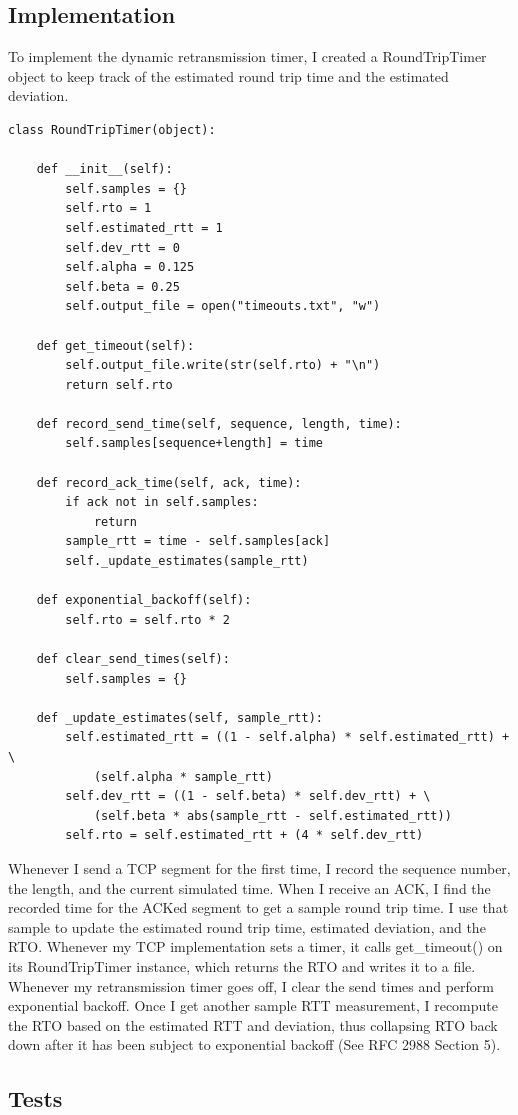 \documentclass[11pt]{article}
\begin{document}
\subsection{Implementation}
To implement the dynamic retransmission timer, I created a RoundTripTimer object to keep track of the estimated round trip time and the estimated deviation.
\begin{lstlisting}
class RoundTripTimer(object):
	
	def __init__(self):
		self.samples = {}
		self.rto = 1
		self.estimated_rtt = 1
		self.dev_rtt = 0
		self.alpha = 0.125
		self.beta = 0.25
		self.output_file = open("timeouts.txt", "w")

	def get_timeout(self):
		self.output_file.write(str(self.rto) + "\n")
		return self.rto

	def record_send_time(self, sequence, length, time):
		self.samples[sequence+length] = time

	def record_ack_time(self, ack, time):
		if ack not in self.samples:
			return
		sample_rtt = time - self.samples[ack]
		self._update_estimates(sample_rtt)

	def exponential_backoff(self):
		self.rto = self.rto * 2

	def clear_send_times(self):
		self.samples = {}

	def _update_estimates(self, sample_rtt):
		self.estimated_rtt = ((1 - self.alpha) * self.estimated_rtt) + \
			(self.alpha * sample_rtt)
		self.dev_rtt = ((1 - self.beta) * self.dev_rtt) + \
			(self.beta * abs(sample_rtt - self.estimated_rtt))
		self.rto = self.estimated_rtt + (4 * self.dev_rtt)
\end{lstlisting}
Whenever I send a TCP segment for the first time, I record the sequence number, the length, and the current simulated time. When I receive an ACK, I find the recorded time for the ACKed segment to get a sample round trip time. I use that sample to update the estimated round trip time, estimated deviation, and the RTO. Whenever my TCP implementation sets a timer, it calls get\_timeout() on its RoundTripTimer instance, which returns the RTO and writes it to a file. Whenever my retransmission timer goes off, I clear the send times and perform exponential backoff. Once I get another sample RTT measurement, I recompute the RTO based on the estimated RTT and deviation, thus collapsing RTO back down after it has been subject to exponential backoff (See RFC 2988 Section 5).
\subsection{Tests}
\end{document}

